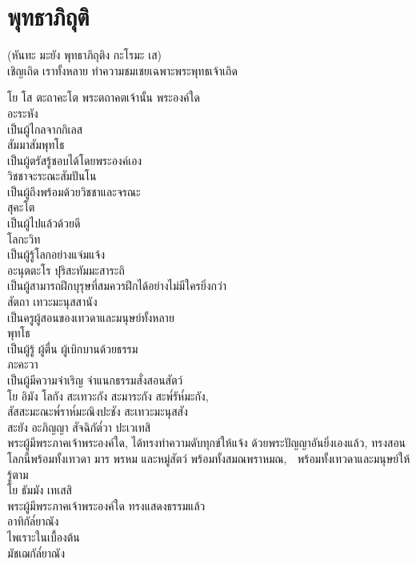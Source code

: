 \documentclass{article}
\begin{document}
\section{พุทธาภิถุติ}
\begin{center}
(หันทะ มะยัง พุทธาภิถุติง กะโรมะ เส)\\
เชิญเถิด เราทั้งหลาย ทำความชมเชยเฉพาะพระพุทธเจ้าเถิด
\end{center}
โย โส ตะถาคะโต\newline
\indent พระตถาคตเจ้านั้น พระองค์ใด\\
อะระหัง\\
\indent เป็นผู้ไกลจากกิเลส\\
สัมมาสัมพุทโธ\\
\indent เป็นผู้ตรัสรู้ชอบได้โดยพระองค์เอง\\
วิชชาจะระณะสัมปันโน\\
\indent เป็นผู้ถึงพร้อมด้วยวิชชาและจรณะ\\
สุคะโต\\
\indent เป็นผู้ไปแล้วด้วยดี\\
โลกะวิท\\
\indent เป็นผู้รู้โลกอย่างแจ่มแจ้ง\\
อะนุตตะโร ปุริสะทัมมะสาระถิ\\
\indent เป็นผู้สามารถฝึกบุรุษที่สมควรฝึกได้อย่างไม่มีใครยิ่งกว่า\\
สัตถา เทวะมะนุสสานัง\\
\indent เป็นครูผู้สอนของเทวดาและมนุษย์ทั้งหลาย\\
พุทโธ\\
\indent เป็นผู้รู้ ผู้ตื่น ผู้เบิกบานด้วยธรรม\\
ภะคะวา\\
\indent เป็นผู้มีความจำเริญ จำแนกธรรมสั่งสอนสัตว์\\
โย อิมัง โลกัง สะเทวะกัง สะมาระกัง สะพ๎รัห๎มะกัง, \\
สัสสะมะณะพ๎ราห๎มะณิงปะชัง สะเทวะมะนุสสัง\\
 สะยัง อะภิญญา สัจฉิกัต๎วา ปะเวเทสิ\\
\indent พระผู้มีพระภาคเจ้าพระองค์ใด, ได้ทรงทำความดับทุกข์ให้แจ้ง 
ด้วยพระปัญญาอันยิ่งเองแล้ว, ทรงสอนโลกนี้พร้อมทั้งเทวดา 
มาร พรหม และหมู่สัตว์ พร้อมทั้งสมณพราหมณ, 
พร้อมทั้งเทวดาและมนุษย์ให้รู้ตาม\\
โย ธัมมัง เทเสสิ\\
\indent พระผู้มีพระภาคเจ้าพระองค์ใด ทรงแสดงธรรมแล้ว\\
อาทิกัล๎ยาณัง\\
\indent ไพเราะในเบื้องต้น\\
มัชเฌกัล๎ยาณัง\\
\end{document}
